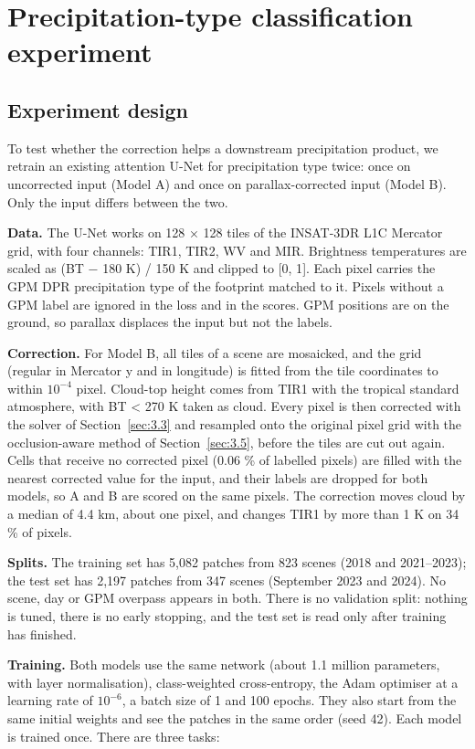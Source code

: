 \section{Precipitation-type classification experiment}
\label{app:unet}

\subsection{Experiment design}\label{sec:4.8}

To test whether the correction helps a downstream precipitation product, we retrain an existing attention U-Net for precipitation type twice: once on uncorrected input (Model A) and once on parallax-corrected input (Model B). Only the input differs between the two.

\textbf{Data.} The U-Net works on 128 × 128 tiles of the INSAT-3DR L1C Mercator grid, with four channels: TIR1, TIR2, WV and MIR. Brightness temperatures are scaled as (BT − 180 K) / 150 K and clipped to {[}0, 1{]}. Each pixel carries the GPM DPR precipitation type of the footprint matched to it. Pixels without a GPM label are ignored in the loss and in the scores. GPM positions are on the ground, so parallax displaces the input but not the labels.

\textbf{Correction.} For Model B, all tiles of a scene are mosaicked, and the grid (regular in Mercator y and in longitude) is fitted from the tile coordinates to within \(10^{-4}\) pixel. Cloud-top height comes from TIR1 with the tropical standard atmosphere, with BT \textless{} 270 K taken as cloud. Every pixel is then corrected with the solver of Section~\ref{sec:3.3} and resampled onto the original pixel grid with the occlusion-aware method of Section~\ref{sec:3.5}, before the tiles are cut out again. Cells that receive no corrected pixel (0.06 \% of labelled pixels) are filled with the nearest corrected value for the input, and their labels are dropped for both models, so A and B are scored on the same pixels. The correction moves cloud by a median of 4.4 km, about one pixel, and changes TIR1 by more than 1 K on 34 \% of pixels.

\textbf{Splits.} The training set has 5,082 patches from 823 scenes (2018 and 2021--2023); the test set has 2,197 patches from 347 scenes (September 2023 and 2024). No scene, day or GPM overpass appears in both. There is no validation split: nothing is tuned, there is no early stopping, and the test set is read only after training has finished.

\textbf{Training.} Both models use the same network (about 1.1 million parameters, with layer normalisation), class-weighted cross-entropy, the Adam optimiser at a learning rate of \(10^{-6}\), a batch size of 1 and 100 epochs. They also start from the same initial weights and see the patches in the same order (seed 42). Each model is trained once. There are three tasks:

